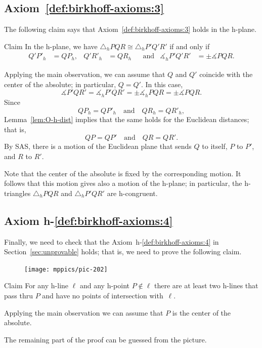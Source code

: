 \subsection*{Axiom~\ref{def:birkhoff-axioms:3}}

The following claim says that Axiom~\ref{def:birkhoff-axioms:3} holds in the h-plane.

\begin{thm}{Claim}
In the h-plane, we have
$\triangle_h P Q R 
\cong
\triangle_h P' Q' R'$
if and only if 
\begin{align*}
Q' P'_h&=Q P_h, & Q' R'_h&= Q R_h &&\text{and}
&\measuredangle_h P' Q' R'&=\pm\measuredangle P Q R.
\end{align*}
 
\end{thm}

Applying the main observation, 
we can assume that $Q$ and $Q'$ coincide with the center of the absolute; in particular, $Q=Q'$.
In this case, 
$$\measuredangle P' Q R'=\measuredangle_h P' Q R'=\pm\measuredangle_h P Q R=\pm\measuredangle P Q R.$$
Since 
$$Q P_h=Q P'_h\quad \text{and}\quad Q R_h=Q R'_h,$$
Lemma~\ref{lem:O-h-dist} implies that the same holds for the Euclidean distances;
that is,
$$Q P=Q P'
\quad
\text{and}
\quad
Q R=Q R'.$$
By SAS,
there is a motion of the Euclidean plane that sends
$Q$ to itself,
$P$ to $P'$, 
and $R$ to $R'$.

Note that the center of the absolute is fixed by the corresponding motion.
It follows that this motion gives also a motion of the h-plane;
in particular, the h-triangles 
$\triangle_h P Q R$ and $\triangle_h P' Q R'$ are h-congruent.
\qeds

\subsection*{Axiom h-$\!$\ref{def:birkhoff-axioms:4}}

Finally, we need to check that the Axiom~h-$\!$\ref{def:birkhoff-axioms:4} in Section~\ref{sec:unprovable} holds;
that is, we need to prove the following claim.

{

\begin{figure}
\vskip-4mm
\centering
\texttt{[image: mppics/pic-202]}
\end{figure}

\begin{thm}{Claim}
For any h-line $\ell$ and any h-point $P\notin\ell$ there are at least two h-lines that pass thru $P$ 
and have no points of intersection with~$\ell$.
\end{thm}

Applying the main observation we can assume that $P$ is the center of the absolute.

The remaining part of the proof can be guessed from the picture.
\qeds

}

